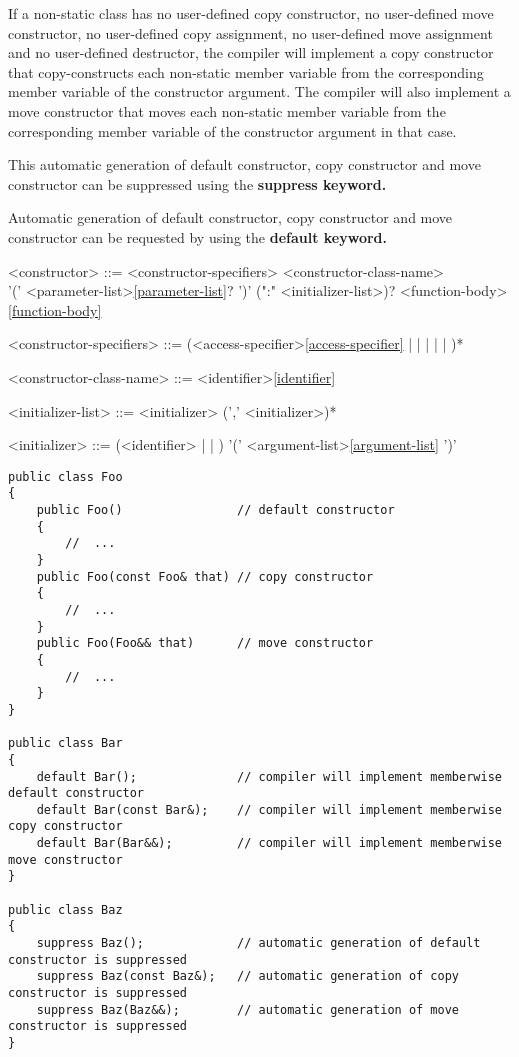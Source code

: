 \documentclass[a4paper,oneside,11pt]{article}
\begin{document}
If a non-static class has no user-defined copy constructor,
no user-defined move constructor, no user-defined copy assignment, no user-defined move assignment and no user-defined destructor,
the compiler will implement a copy constructor that
copy-constructs each non-static member variable from the corresponding member variable of the constructor argument.
The compiler will also implement a move constructor that moves each non-static member variable from the corresponding
member variable of the constructor argument in that case.

This automatic generation of default constructor, copy constructor and move constructor can be suppressed using the \bf{suppress} keyword.

Automatic generation of default constructor, copy constructor and move constructor can be requested by using the \bf{default} keyword.

\begin{grammar}
\label{constructor}<constructor> ::= <constructor-specifiers> <constructor-class-name>\\
'(' <parameter-list>\ref{parameter-list}? ')' (":" <initializer-list>)? <function-body>\ref{function-body}

<constructor-specifiers> ::= (<access-specifier>\ref{access-specifier} |  |  |  |  | )*

<constructor-class-name> ::= <identifier>\ref{identifier}

<initializer-list> ::= <initializer> (',' <initializer>)*

<initializer>  ::= (<identifier> |  | ) '(' <argument-list>\ref{argument-list} ')'
\end{grammar}

\begin{lstlisting}[frame=trBL]
public class Foo
{
    public Foo()                // default constructor
    {
        //  ...
    }
    public Foo(const Foo& that) // copy constructor
    {
        //  ...
    }
    public Foo(Foo&& that)      // move constructor
    {
        //  ...
    }
}

public class Bar
{
    default Bar();              // compiler will implement memberwise default constructor
    default Bar(const Bar&);    // compiler will implement memberwise copy constructor
    default Bar(Bar&&);         // compiler will implement memberwise move constructor
}

public class Baz
{
    suppress Baz();             // automatic generation of default constructor is suppressed
    suppress Baz(const Baz&);   // automatic generation of copy constructor is suppressed
    suppress Baz(Baz&&);        // automatic generation of move constructor is suppressed
}
\end{lstlisting}
\end{document}
